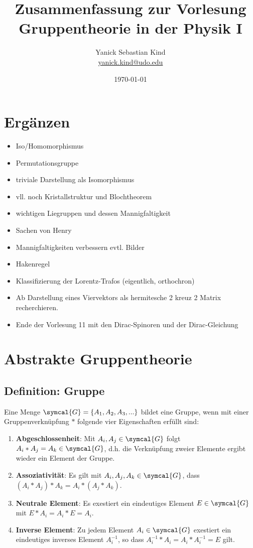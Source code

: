 \documentclass[
  captions=tableheading,  %
  titlepage=firstiscover, %
]{scrartcl}
\author{%
  Yanick Sebastian Kind\\%
  \href{mailto:yanick.kind@udo.edu}{yanick.kind@udo.edu}%
}
\title{Zusammenfassung zur Vorlesung Gruppentheorie in der Physik I}
\date{\today}
\begin{document}
\maketitle

\tableofcontents
\newpage
\section{Ergänzen}
\begin{itemize}
  \item Iso/Homomorphismus
  \item Permutationsgruppe
  \item triviale Darstellung als Isomorphismus
  \item vll. noch Kristallstruktur und Blochtheorem 
  \item wichtigen Liegruppen und dessen Mannigfaltigkeit
  \item Sachen von Henry
  \item Mannigfaltigkeiten verbessern evtl. Bilder
  \item Hakenregel  
  \item Klassifizierung der Lorentz-Trafos (eigentlich, orthochron)
  \item Ab Darstellung eines Viervektors als hermitesche 2 kreuz 2 Matrix recherchieren.
  \item Ende der Vorlesung 11 mit den Dirac-Spinoren und der Dirac-Gleichung
\end{itemize}
\section{Abstrakte Gruppentheorie}
\subsection{Definition: Gruppe}
  Eine Menge $\symcal{G} = \{A_1, A_2,A_3,...\}$ bildet eine Gruppe, wenn mit einer Gruppenverknüpfung $*$ folgende vier Eigenschaften erfüllt sind:
  \begin{enumerate}
    \item \textbf{Abgeschlossenheit}: Mit $A_i, A_j \in \symcal{G}$ folgt $A_i * A_j = A_k \in \symcal{G}$, d.h. die Verknüpfung zweier 
    Elemente ergibt wieder ein Element der Gruppe.
    \item \textbf{Assoziativität}: Es gilt mit $A_i, A_j, A_k \in \symcal{G}$, dass $(A_i * A_j) * A_k = A_i * (A_j*A_k)$.
    \item \textbf{Neutrale Element}: Es exestiert ein eindeutiges Element $E\in \symcal{G}$ mit $E * A_i = A_i * E  = A_i$.
    \item \textbf{Inverse Element}: Zu jedem Element $A_i \in \symcal{G}$ exestiert ein eindeutiges inverses Element $A_i^{-1}$,
      so dass $A_i^{-1} * A_i = A_i * A_i^{-1} = E$ gilt.
  \end{enumerate}
\end{document}
